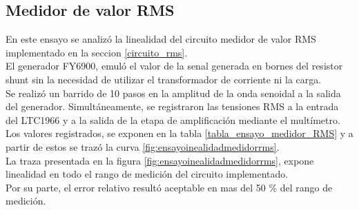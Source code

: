 \subsection{Medidor de valor RMS}\label{ensayo_medidor_rms}
En este ensayo se analiz\'{o} la linealidad del circuito medidor de valor RMS implementado en la seccion \ref{circuito_rms}.\\
El generador FY6900, emul\'{o} el valor de la senal generada en bornes del resistor shunt sin la necesidad de utilizar el transformador de corriente ni la carga.\\
Se realiz\'{o} un barrido de 10 pasos en la amplitud de la onda senoidal a la salida del generador. Simultáneamente, se registraron las tensiones RMS a la entrada del LTC1966 y a la salida de la etapa de amplificaci\'{o}n mediante el mult\'{i}metro. Los valores registrados, se exponen en la tabla \ref{tabla_ensayo_medidor_RMS} y a partir de estos se traz\'{o} la curva \ref{fig:ensayoinealidadmedidorrms}.\\
La traza presentada en la figura \ref{fig:ensayoinealidadmedidorrms}, expone linealidad en todo el rango de medici\'{o}n del circuito implementado.\\
Por su parte, el error relativo result\'{o} aceptable en mas del 50 \% del rango de medici\'{o}n.\\
